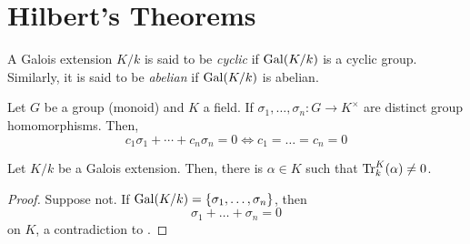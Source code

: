 \section{Hilbert's Theorems}

\begin{definition}
    A Galois extension $K/k$ is said to be \emph{cyclic} if $\operatorname{Gal}(K/k)$ is a cyclic group. Similarly, it is said to be \emph{abelian} if $\operatorname{Gal}(K/k)$ is abelian.
\end{definition}

\begin{theorem}
    Let $G$ be a group (monoid) and $K$ a field. If $\sigma_1,\dots,\sigma_n: G\to K^\times$ are distinct group homomorphisms. Then, 
    \begin{equation*}
        c_1\sigma_1 + \cdots + c_n\sigma_n = 0 \iff c_1 = \dots = c_n = 0
    \end{equation*}
\end{theorem}

\begin{corollary}
    Let $K/k$ be a Galois extension. Then, there is $\alpha\in K$ such that $\operatorname{Tr}^K_k(\alpha)\ne0$.
\end{corollary}
\begin{proof}
    Suppose not. If $\operatorname{Gal}(K/k) = \{\sigma_1,\dots,\sigma_n\}$, then 
    \begin{equation*}
        \sigma_1 + \dots + \sigma_n = 0
    \end{equation*}
    on $K$, a contradiction to . 
\end{proof}

